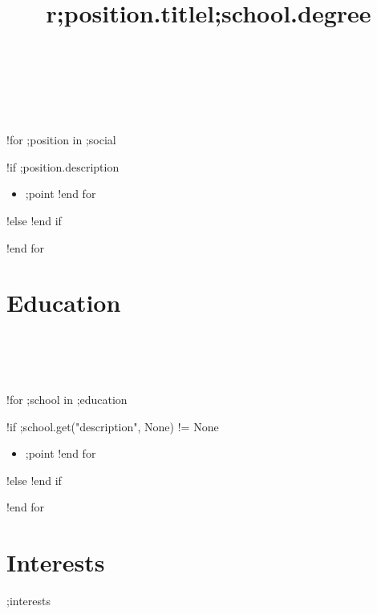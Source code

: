 \documentclass[margin,line]{res}
\begin{document}
\begin{sloppypar}
\begin{resume}
\begin{format}
  \title{r}\\
  \\
  \body\\
\end{format}

!for ;position in ;social
    \title{;position.title}
    \begin{position}
        \vspace{-.3cm}
        !if ;position.description
            \begin{itemize}
            !for ;point in ;position.description
                \item ;point
            !end for
            \end{itemize}
        !else
            \vspace{-.2cm}
        !end if
    \end{position}
!end for


\section{Education}

\begin{format}
  \title{l}\\
  \\
  \body\\
\end{format}

!for ;school in ;education
    \title{\textbf{;school.degree}}
    \begin{position}
        \vspace{-.3cm}
        !if ;school.get("description", None) != None
            \begin{itemize}
            !for ;point in ;school.description
                \item ;point
            !end for
            \end{itemize}
        !else
            \vspace{-.2cm}
        !end if
    \end{position}
!end for

\section{Interests}
;interests


\vfill

\end{resume}
\end{sloppypar}
\end{document}
